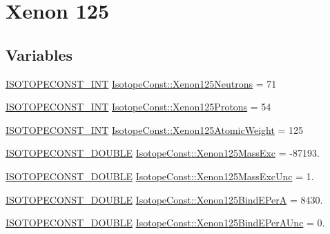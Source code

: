 \hypertarget{group___isotope_const-_xenon-_xe125}{}\section{Xenon 125}
\label{group___isotope_const-_xenon-_xe125}
\subsection*{Variables}
\begin{DoxyCompactItemize}
\item 
\mbox{\hyperlink{group___isotope_const-_macros_ga5f18360b3e99483a35c32d789e62621c}{I\+S\+O\+T\+O\+P\+E\+C\+O\+N\+S\+T\+\_\+\+I\+NT}} \mbox{\hyperlink{group___isotope_const-_xenon-_xe125_gaf18259d29b89bbf52aae7c227820bd68}{Isotope\+Const\+::\+Xenon125\+Neutrons}} = 71
\item 
\mbox{\hyperlink{group___isotope_const-_macros_ga5f18360b3e99483a35c32d789e62621c}{I\+S\+O\+T\+O\+P\+E\+C\+O\+N\+S\+T\+\_\+\+I\+NT}} \mbox{\hyperlink{group___isotope_const-_xenon-_xe125_ga985750bc11d721b474164554ad75b33d}{Isotope\+Const\+::\+Xenon125\+Protons}} = 54
\item 
\mbox{\hyperlink{group___isotope_const-_macros_ga5f18360b3e99483a35c32d789e62621c}{I\+S\+O\+T\+O\+P\+E\+C\+O\+N\+S\+T\+\_\+\+I\+NT}} \mbox{\hyperlink{group___isotope_const-_xenon-_xe125_ga6cc85dc5c6e91b521ebc3991229ee5dd}{Isotope\+Const\+::\+Xenon125\+Atomic\+Weight}} = 125
\item 
\mbox{\hyperlink{group___isotope_const-_macros_ga8f45a7272ce02c0b4c65c44636ed719a}{I\+S\+O\+T\+O\+P\+E\+C\+O\+N\+S\+T\+\_\+\+D\+O\+U\+B\+LE}} \mbox{\hyperlink{group___isotope_const-_xenon-_xe125_ga9e3700f89b7c75a09d960d47b2f7ab93}{Isotope\+Const\+::\+Xenon125\+Mass\+Exc}} = -\/87193.
\item 
\mbox{\hyperlink{group___isotope_const-_macros_ga8f45a7272ce02c0b4c65c44636ed719a}{I\+S\+O\+T\+O\+P\+E\+C\+O\+N\+S\+T\+\_\+\+D\+O\+U\+B\+LE}} \mbox{\hyperlink{group___isotope_const-_xenon-_xe125_gac2fbaeb0066c86b382324e0652318f40}{Isotope\+Const\+::\+Xenon125\+Mass\+Exc\+Unc}} = 1.
\item 
\mbox{\hyperlink{group___isotope_const-_macros_ga8f45a7272ce02c0b4c65c44636ed719a}{I\+S\+O\+T\+O\+P\+E\+C\+O\+N\+S\+T\+\_\+\+D\+O\+U\+B\+LE}} \mbox{\hyperlink{group___isotope_const-_xenon-_xe125_ga64b740fd381e082f720033e18863f322}{Isotope\+Const\+::\+Xenon125\+Bind\+E\+PerA}} = 8430.
\item 
\mbox{\hyperlink{group___isotope_const-_macros_ga8f45a7272ce02c0b4c65c44636ed719a}{I\+S\+O\+T\+O\+P\+E\+C\+O\+N\+S\+T\+\_\+\+D\+O\+U\+B\+LE}} \mbox{\hyperlink{group___isotope_const-_xenon-_xe125_ga2b33ba39666cf38f00cc6078455b4886}{Isotope\+Const\+::\+Xenon125\+Bind\+E\+Per\+A\+Unc}} = 0.

\end{DoxyCompactItemize}
